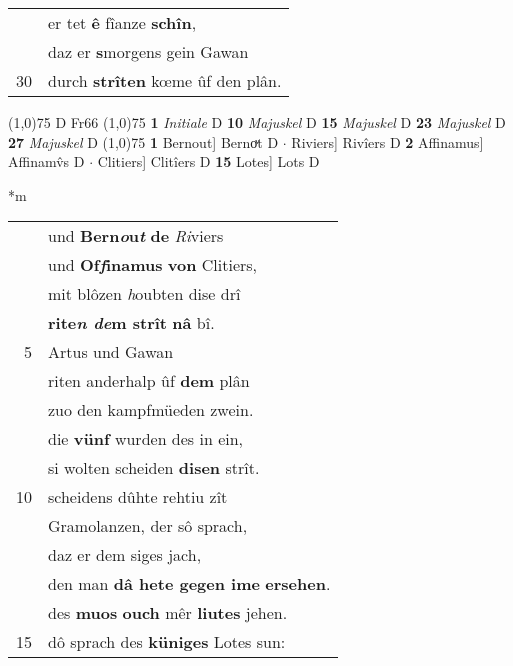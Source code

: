 \documentclass[8pt,a4paper,notitlepage]{article}
\begin{document}
\begin{table}[ht]
\begin{minipage}[t]{0.5\linewidth}
\begin{tabular}{rl}
 & er tet \textbf{ê} fîanze \textbf{schîn},\\ 
 & daz er \textbf{s}morgens gein Gawan\\ 
30 & durch \textbf{strîten} kœme ûf den plân.\\ 
\end{tabular}
\scriptsize
\line(1,0){75} \newline
D Fr66 \newline
\line(1,0){75} \newline
\textbf{1} \textit{Initiale} D  \textbf{10} \textit{Majuskel} D  \textbf{15} \textit{Majuskel} D  \textbf{23} \textit{Majuskel} D  \textbf{27} \textit{Majuskel} D  \newline
\line(1,0){75} \newline
\textbf{1} Bernout] Bernoͮt D  $\cdot$ Riviers] Rivîers D \textbf{2} Affinamus] Affinamv̂s D  $\cdot$ Clitiers] Clitîers D \textbf{15} Lotes] Lots D \newline
\end{minipage}
\hspace{0.5cm}
\begin{minipage}[t]{0.5\linewidth}
\small
\begin{center}*m
\end{center}
\begin{tabular}{rl}
 & und \textbf{Bern\textit{o}u\textit{t}} \textbf{de} \textit{Ri}viers\\ 
 & und \textbf{Of\textit{f}inamus} \textbf{von} Clitiers,\\ 
 & mit blôzen \textit{h}oubten dise drî\\ 
 & \textbf{rite\textit{n de}m strît} \textbf{nâ} bî.\\ 
5 & Artus und Gawan\\ 
 & riten anderhalp ûf \textbf{dem} plân\\ 
 & zuo den kampfmüeden zwein.\\ 
 & die \textbf{vünf} wurden des in ein,\\ 
 & si wolten scheiden \textbf{disen} strît.\\ 
10 & scheidens dûhte rehtiu zît\\ 
 & Gramolanzen, der sô sprach,\\ 
 & daz er dem siges jach,\\ 
 & den man \textbf{dâ hete gegen ime} \textbf{ersehen}.\\ 
 & des \textbf{muos} \textbf{ouch} mêr \textbf{liutes} jehen.\\ 
15 & dô sprach des \textbf{küniges} Lotes sun:\\ 

\end{tabular}
\end{minipage}
\end{table}
\end{document}
